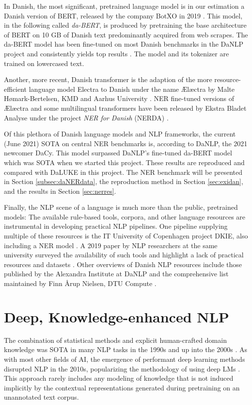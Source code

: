 \documentclass[main.tex]{subfiles}
\begin{document}
In Danish, the most significant, pretrained language model is in our estimation a Danish version of BERT, released by the company BotXO in 2019 \cite{botxo2019dabert}.
This model, in the following called \emph{da-BERT}, is produced by pretraining the base architecture of BERT \cite{devlin2019bert} on 10 GB of Danish text predominantly acquired from web scrapes.
The da-BERT model has been fine-tuned on most Danish benchmarks in the DaNLP project and consistently yields top results \cite{danlp2021, hvingelby2020dane}.
The model and its tokenizer are trained on lowercased text.

Another, more recent, Danish transformer is the adaption of the more resource-efficient language model Electra to Danish under the name Ælæctra by Malte Hømark-Bertelsen, KMD and Aarhus University \cite{bertelsen2020lctra}.
NER fine-tuned versions of Ælæctra and some multilingual transformers have been released by Ekstra Bladet Analyse under the project \emph{NER for Danish} (NERDA) \cite{kjeldgaard2020nerda}.

Of this plethora of Danish language models and NLP frameworks, the current (June 2021) SOTA on central NER benchmarks is, according to DaNLP, the 2021 newcomer DaCy.
This model surpassed DaNLP's fine-tuned da-BERT model which was SOTA when we started this project\footnotemark.
These results are reproduced and compared with DaLUKE in this project.
The NER benchmark will be presented in Section \ref{subsec:daNERdata}, the reproduction method in Section \ref{sec:exidan}, and the results in Section \ref{sec:nerres}.

Finally, the NLP scene of a language is much more than the public, pretrained models:
The available rule-based tools, corpora, and other language resources are instrumental in developing practical NLP pipelines.
One pipeline supplying multiple of these resources is the IT University of Copenhagen project DKIE, also including a NER model \cite{derc2014dkie}.
A 2019 paper by NLP researchers at the same university surveyed the availability of such tools and highlight a lack of practical resources and datasets \cite{kirkedal2019lacunae}.
Other overviews of Danish NLP resources include those published by the Alexandra Institute at DaNLP \cite{danlp2021} and the comprehensive list maintained by Finn Årup Nielsen, DTU Compute \cite{arup21awesome}.

\section{Deep, Knowledge-enhanced NLP}
The combination of statistical methods and explicit human-crafted domain knowledge was SOTA in many NLP tasks in the 1990s and up into the 2000s \cite[Sec. 22.5]{russell2016ai}.
As with most other fields of AI, the emergence of performant deep learning methods disrupted NLP in the 2010s, popularizing the methodology of using deep LMs \cite{otter18dlnlp}.
This approach rarely includes any modeling of knowledge that is not induced implicitly by the contextual representations generated during pretraining on an unannotated text corpus.
\end{document}
